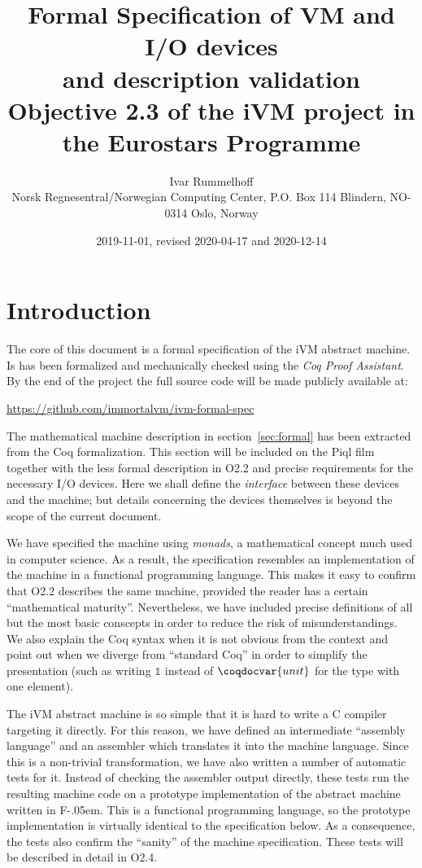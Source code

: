 \documentclass[10pt,a4paper]{article}
\title{%
  Formal Specification of VM and I/O devices\\
  and description validation\\[2ex]
  \large \textbf{Objective 2.3} of the iVM project in the Eurostars Programme
}
\author{Ivar Rummelhoff\\
\small Norsk Regnesentral/Norwegian Computing Center, P.O. Box 114 Blindern, NO-0314 Oslo, Norway }
\date{2019-11-01, revised 2020-04-17 and 2020-12-14}
\newcommand{\mathbbm}{\mathds}
\newcommand{\FSharp}{\textsf{F\nolinebreak[4]\kern-.05em\raisebox{.2ex}{\small\#}}\xspace}
\begin{document}
\maketitle

\section{Introduction}

The core of this document is a formal specification of the iVM abstract machine. Is has been formalized and mechanically checked using the \emph{Coq Proof Assistant}. By the end of the project the full source code will be made publicly available at:

\begin{center}
  \url{https://github.com/immortalvm/ivm-formal-spec}
\end{center}

The mathematical machine description in section~\ref{sec:formal} has been extracted from the Coq formalization. This section will be included on the Piql film together with the less formal description in O2.2 and precise requirements for the necessary I/O devices. Here we shall define the \emph{interface} between these devices and the machine; but details concerning the devices themselves is beyond the scope of the current document.

We have specified the machine using \emph{monads}, a mathematical concept much used in computer science. As a result, the specification resembles an implementation of the machine in a functional programming language. This makes it easy to confirm that O2.2 describes the same machine, provided the reader has a certain ``mathematical maturity''. Nevertheless, we have included precise definitions of all but the most basic conscepts in order to reduce the risk of misunderstandings. We also explain the Coq syntax when it is not obvious from the context and point out when we diverge from ``standard Coq'' in order to simplify the presentation (such as writing $\mathbbm{1}$ instead of $\coqdocvar{unit}$ for the type with one element).

The iVM abstract machine is so simple that it is hard to write a C compiler targeting it directly. For this reason, we have defined an intermediate ``assembly language'' and an assembler which translates it into the machine language. Since this is a non-trivial transformation, we have also written a number of automatic tests for it. Instead of checking the assembler output directly, these tests run the resulting machine code on a prototype implementation of the abstract machine written in \FSharp. This is a functional programming language, so the prototype implementation is virtually identical to the specification below. As a consequence, the tests also confirm the ``sanity'' of the machine specification. These tests will be described in detail in O2.4.
\end{document}

